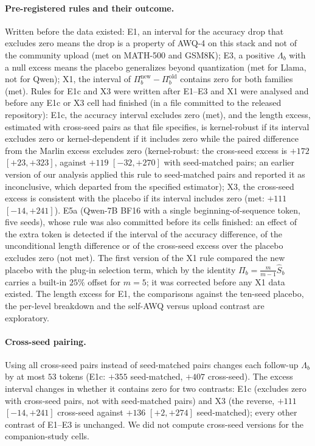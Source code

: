 \documentclass[11pt,a4paper]{article}
\begin{document}
\paragraph{Pre-registered rules and their outcome.} Written before the data existed: E1, an interval for the accuracy drop that excludes zero means the drop is a property of AWQ-4 on this stack and not of the community upload (met on MATH-500 and GSM8K); E3, a positive $\Lambda_b$ with a null excess means the placebo generalizes beyond quantization (met for Llama, not for Qwen); X1, the interval of $\Pi_b^{\mathrm{new}}-\Pi_b^{\mathrm{old}}$ contains zero for both families (met). Rules for E1c and X3 were written after E1--E3 and X1 were analysed and before any E1c or X3 cell had finished (in a file committed to the released repository): E1c, the accuracy interval excludes zero (met), and the length excess, estimated with cross-seed pairs as that file specifies, is kernel-robust if its interval excludes zero or kernel-dependent if it includes zero while the paired difference from the Marlin excess excludes zero (kernel-robust: the cross-seed excess is $+172$ $[+23,+323]$, against $+119$ $[-32,+270]$ with seed-matched pairs; an earlier version of our analysis applied this rule to seed-matched pairs and reported it as inconclusive, which departed from the specified estimator); X3, the cross-seed excess is consistent with the placebo if its interval includes zero (met: $+111$ $[-14,+241]$). E5a (Qwen-7B BF16 with a single beginning-of-sequence token, five seeds), whose rule was also committed before its cells finished: an effect of the extra token is detected if the interval of the accuracy difference, of the unconditional length difference or of the cross-seed excess over the placebo excludes zero (not met). The first version of the X1 rule compared the new placebo with the plug-in selection term, which by the identity $\Pi_b=\tfrac{m}{m-1}\widehat S_b$ carries a built-in $25\%$ offset for $m=5$; it was corrected before any X1 data existed. The length excess for E1, the comparisons against the ten-seed placebo, the per-level breakdown and the self-AWQ versus upload contrast are exploratory.

\paragraph{Cross-seed pairing.} Using all cross-seed pairs instead of seed-matched pairs changes each follow-up $\Lambda_b$ by at most $53$ tokens (E1c: $+355$ seed-matched, $+407$ cross-seed). The excess interval changes in whether it contains zero for two contrasts: E1c (excludes zero with cross-seed pairs, not with seed-matched pairs) and X3 (the reverse, $+111$ $[-14,+241]$ cross-seed against $+136$ $[+2,+274]$ seed-matched); every other contrast of E1--E3 is unchanged. We did not compute cross-seed versions for the companion-study cells.
\end{document}
